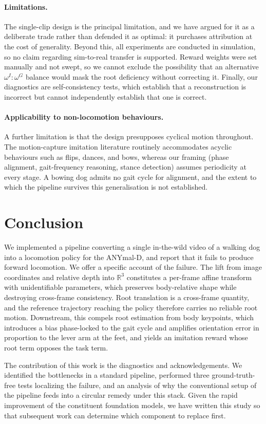 \documentclass{article}
\theoremstyle{plain}
\theoremstyle{definition}
\theoremstyle{remark}
\begin{document}
\paragraph{Limitations.} The single-clip design is the principal limitation,
and we have argued for it as a deliberate trade rather than defended it as
optimal: it purchases attribution at the cost of generality. Beyond this, all
experiments are conducted in simulation, so no claim regarding sim-to-real
transfer is supported. Reward weights were set manually and not swept, so we
cannot exclude the possibility that an alternative
$\omega^{I}\!:\!\omega^{G}$ balance would mask the root deficiency without
correcting it. Finally, our diagnostics are self-consistency tests, which
establish that a reconstruction is incorrect but cannot independently
establish that one is correct.
 
\paragraph{Applicability to non-locomotion behaviours.} A further limitation is
that the design presupposes cyclical motion throughout. The motion-capture
imitation literature routinely accommodates acyclic behaviours such as flips,
dances, and bows, whereas our framing (phase alignment, gait-frequency
reasoning, stance detection) assumes periodicity at every stage. A bowing dog
admits no gait cycle for alignment, and the extent to which the pipeline
survives this generalisation is not established.

\section{Conclusion}
 
We implemented a pipeline converting a single in-the-wild video of a walking
dog into a locomotion policy for the ANYmal-D, and report that it fails to
produce forward locomotion. We offer a specific account of the failure. The
lift from image coordinates and relative depth into $\mathbb{R}^3$ constitutes
a per-frame affine transform with unidentifiable parameters, which preserves
body-relative shape while destroying cross-frame consistency. Root translation
is a cross-frame quantity, and the reference trajectory reaching the policy
therefore carries no reliable root motion. Downstream, this compels root
estimation from body keypoints, which introduces a bias phase-locked to the
gait cycle and amplifies orientation error in proportion to the lever arm at
the feet, and yields an imitation reward whose root term opposes the task
term.
 
The contribution of this work is the diagnostics and acknowledgements. We identified  the bottlenecks in a standard pipeline, performed three ground-truth-free tests localizing the failure, and an analysis of why the conventional setup of the pipeline feeds into a circular remedy under this stack. Given the rapid improvement of the constituent foundation models, we have written this study so that subsequent work can determine which component to replace first.



\end{document}
